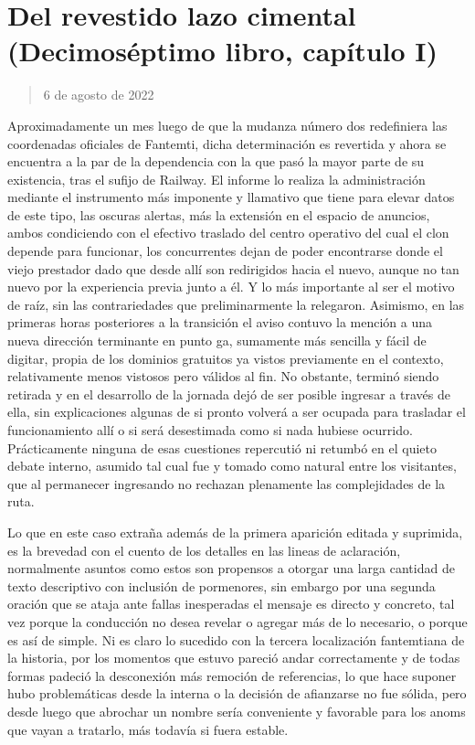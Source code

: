 \documentclass[
]{book}
\begin{document}
\hypertarget{del-revestido-lazo-cimental-decimosuxe9ptimo-libro-capuxedtulo-i}{%
\section{Del revestido lazo cimental (Decimoséptimo libro, capítulo I)}\label{del-revestido-lazo-cimental-decimosuxe9ptimo-libro-capuxedtulo-i}}

\begin{quote}
6 de agosto de 2022
\end{quote}

Aproximadamente un mes luego de que la mudanza número dos redefiniera las coordenadas oficiales de Fantemti, dicha determinación es revertida y ahora se encuentra a la par de la dependencia con la que pasó la mayor parte de su existencia, tras el sufijo de Railway. El informe lo realiza la administración mediante el instrumento más imponente y llamativo que tiene para elevar datos de este tipo, las oscuras alertas, más la extensión en el espacio de anuncios, ambos condiciendo con el efectivo traslado del centro operativo del cual el clon depende para funcionar, los concurrentes dejan de poder encontrarse donde el viejo prestador dado que desde allí son redirigidos hacia el nuevo, aunque no tan nuevo por la experiencia previa junto a él. Y lo más importante al ser el motivo de raíz, sin las contrariedades que preliminarmente la relegaron. Asimismo, en las primeras horas posteriores a la transición el aviso contuvo la mención a una nueva dirección terminante en punto ga, sumamente más sencilla y fácil de digitar, propia de los dominios gratuitos ya vistos previamente en el contexto, relativamente menos vistosos pero válidos al fin. No obstante, terminó siendo retirada y en el desarrollo de la jornada dejó de ser posible ingresar a través de ella, sin explicaciones algunas de si pronto volverá a ser ocupada para trasladar el funcionamiento allí o si será desestimada como si nada hubiese ocurrido. Prácticamente ninguna de esas cuestiones repercutió ni retumbó en el quieto debate interno, asumido tal cual fue y tomado como natural entre los visitantes, que al permanecer ingresando no rechazan plenamente las complejidades de la ruta.

Lo que en este caso extraña además de la primera aparición editada y suprimida, es la brevedad con el cuento de los detalles en las lineas de aclaración, normalmente asuntos como estos son propensos a otorgar una larga cantidad de texto descriptivo con inclusión de pormenores, sin embargo por una segunda oración que se ataja ante fallas inesperadas el mensaje es directo y concreto, tal vez porque la conducción no desea revelar o agregar más de lo necesario, o porque es así de simple. Ni es claro lo sucedido con la tercera localización fantemtiana de la historia, por los momentos que estuvo pareció andar correctamente y de todas formas padeció la desconexión más remoción de referencias, lo que hace suponer hubo problemáticas desde la interna o la decisión de afianzarse no fue sólida, pero desde luego que abrochar un nombre sería conveniente y favorable para los anoms que vayan a tratarlo, más todavía si fuera estable.
\end{document}
